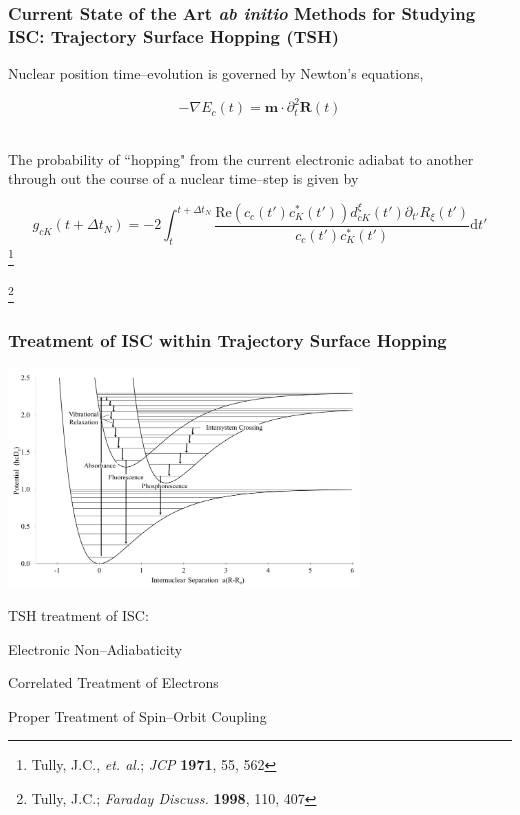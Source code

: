 \documentclass[usepdftitle=false,10pt]{beamer}
\newcommand{\cmark}{\color{green} \ding{51}}%
\newcommand{\done}{\rlap{$\square$}{\raisebox{2pt}{\large\hspace{1pt}\cmark}}%
\hspace{-2.5pt}}
\renewcommand{\Re}{\text{Re}}                             %
\newcommand*\vc[1]{\boldsymbol{#1}}
\newcommand\blfootnote[1]{%
  \begingroup
  \renewcommand\thefootnote{}\footnote{#1}%
  \addtocounter{footnote}{-1}%
  \endgroup
}
\begin{document}
\begin{frame}
  \frametitle{Current State of the Art \emph{ab initio} Methods for Studying 
  ISC: Trajectory Surface Hopping (TSH)}

  Nuclear position time--evolution is governed by Newton's equations,

  \begin{equation*}
    -\nabla E_c(t) = \vc{m}\cdot \partial_t^2\vc{R}(t)
  \end{equation*}

  ~\\
  The probability of ``hopping" from the current electronic adiabat to another
  through out the course of a nuclear time--step is given by

  \begin{equation*}
    g_{cK}(t + \Delta t_N) = -2 \int_t^{t + \Delta t_N} 
      \frac{\Re(c_c(t') c^*_K(t'))d_{cK}^\xi (t') \partial_{t'}
      R_{\xi}(t')}{c_c(t') c^*_K(t')}\mathrm{d}t'
  \end{equation*}
  \blfootnote{\tiny Tully, J.C., \emph{et. al.}; \emph{JCP} \textbf{1971}, 55, 562}
  \blfootnote{\tiny Tully, J.C.; \emph{Faraday Discuss.} \textbf{1998}, 110, 407}
\end{frame}

\begin{frame}
  \frametitle{Treatment of ISC within Trajectory Surface Hopping}
  \begin{center}
  \includegraphics[width=0.7\textwidth]{ISC} 
  \end{center}
  \vspace{-0.5cm}
  TSH treatment of ISC: 
  \begin{mylist}
    \item[\done] Electronic Non--Adiabaticity
    \item Correlated Treatment of Electrons
    \item Proper Treatment of Spin--Orbit Coupling
  \end{mylist}
\end{frame}
\end{document}
